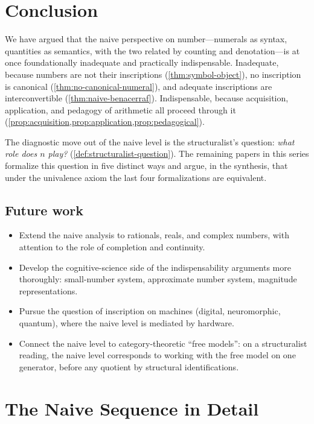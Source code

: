 \documentclass[12pt]{article}
\theoremstyle{definition}
\theoremstyle{remark}
\begin{document}
\section{Conclusion}
\label{sec:conclusion}

We have argued that the naive perspective on number---numerals as syntax,
quantities as semantics, with the two related by counting and
denotation---is at once foundationally inadequate and practically
indispensable. Inadequate, because numbers are not their inscriptions
(\cref{thm:symbol-object}), no inscription is canonical
(\cref{thm:no-canonical-numeral}), and adequate inscriptions are
interconvertible (\cref{thm:naive-benacerraf}). Indispensable, because
acquisition, application, and pedagogy of arithmetic all proceed
through it (\cref{prop:acquisition,prop:application,prop:pedagogical}).

The diagnostic move out of the naive level is the structuralist's
question: \emph{what role does $n$ play?} (\cref{def:structuralist-question}).
The remaining papers in this series formalize this question in five
distinct ways and argue, in the synthesis, that under the univalence
axiom the last four formalizations are equivalent.

\subsection{Future work}

\begin{itemize}
\item Extend the naive analysis to rationals, reals, and complex
numbers, with attention to the role of completion and continuity.
\item Develop the cognitive-science side of the indispensability
arguments more thoroughly: small-number system, approximate number
system, magnitude representations.
\item Pursue the question of inscription on machines (digital,
neuromorphic, quantum), where the naive level is mediated by hardware.
\item Connect the naive level to category-theoretic ``free models'':
on a structuralist reading, the naive level corresponds to working with
the free model on one generator, before any quotient by structural
identifications.
\end{itemize}

\appendix

\section{The Naive Sequence in Detail}
\label{app:naive-sequence}
\end{document}
